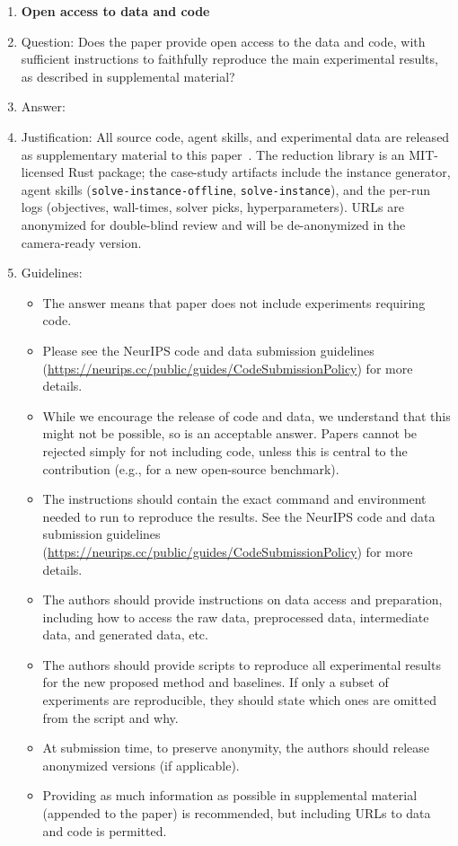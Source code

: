 \begin{enumerate}
\item {\bf Open access to data and code}
    \item[] Question: Does the paper provide open access to the data and code, with sufficient instructions to faithfully reproduce the main experimental results, as described in supplemental material?
    \item[] Answer: \answerYes{}
    \item[] Justification: All source code, agent skills, and experimental data are released as supplementary material to this paper~\cite{Supplement}. The reduction library is an MIT-licensed Rust package; the case-study artifacts include the instance generator, agent skills (\texttt{solve-instance-offline}, \texttt{solve-instance}), and the per-run logs (objectives, wall-times, solver picks, hyperparameters). URLs are anonymized for double-blind review and will be de-anonymized in the camera-ready version.
    \item[] Guidelines:
    \begin{itemize}
        \item The answer \answerNA{} means that paper does not include experiments requiring code.
        \item Please see the NeurIPS code and data submission guidelines (\url{https://neurips.cc/public/guides/CodeSubmissionPolicy}) for more details.
        \item While we encourage the release of code and data, we understand that this might not be possible, so \answerNo{} is an acceptable answer. Papers cannot be rejected simply for not including code, unless this is central to the contribution (e.g., for a new open-source benchmark).
        \item The instructions should contain the exact command and environment needed to run to reproduce the results. See the NeurIPS code and data submission guidelines (\url{https://neurips.cc/public/guides/CodeSubmissionPolicy}) for more details.
        \item The authors should provide instructions on data access and preparation, including how to access the raw data, preprocessed data, intermediate data, and generated data, etc.
        \item The authors should provide scripts to reproduce all experimental results for the new proposed method and baselines. If only a subset of experiments are reproducible, they should state which ones are omitted from the script and why.
        \item At submission time, to preserve anonymity, the authors should release anonymized versions (if applicable).
        \item Providing as much information as possible in supplemental material (appended to the paper) is recommended, but including URLs to data and code is permitted.
    \end{itemize}



\end{enumerate}

